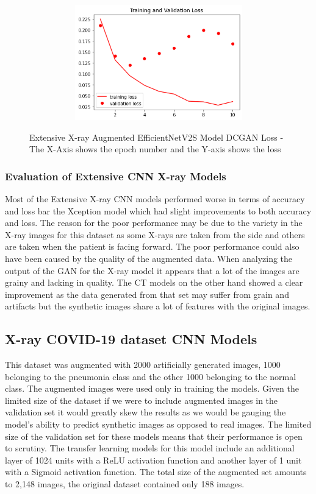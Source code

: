  \begin{figure}[H]
    \centering
    \includegraphics[width=1\textwidth,height=5cm,keepaspectratio]{Images/EfficientNetV2SBaselineTrainingValidationLossExtensiveXRayAugmentedDCGAN.png}\\
    \caption{Extensive X-ray Augmented EfficientNetV2S Model DCGAN Loss - The X-Axis shows the epoch number and the Y-axis shows the loss}
    \label{fig:Extensive X-ray Augmented EfficientNetV2S Model DCGAN Loss}
\end{figure}
\subsubsection{Evaluation of Extensive CNN X-ray Models}
Most of the Extensive X-ray CNN models performed worse in terms of accuracy and loss bar the Xception model which had slight improvements to both accuracy and loss.  The reason for the poor performance may be due to the variety in the X-ray images for this dataset as some X-rays are taken from the side and others are taken when the patient is facing forward. The poor performance could also have been caused by the quality of the augmented data.  When analyzing the output of the GAN for the X-ray model it appears that a lot of the images are grainy and lacking in quality.  The CT models on the other hand showed a clear improvement as the data generated from that set may suffer from grain and artifacts but the synthetic images share a lot of features with the original images.
\subsection{X-ray COVID-19 dataset CNN Models}
This dataset was augmented with 2000 artificially generated images, 1000 belonging to the pneumonia class and the other 1000 belonging to the normal class.  The augmented images were used only in training the models. Given the limited size of the dataset if we were to include augmented images in the validation set it would greatly skew the results as we would be gauging the model's ability to predict synthetic images as opposed to real images.  The limited size of the validation set for these models means that their performance is open to scrutiny.  The transfer learning models for this model include an additional layer of 1024 units with a ReLU activation function and another layer of 1 unit with a Sigmoid activation function.  The total size of the augmented set amounts to 2,148 images, the original dataset contained only 188 images. 
